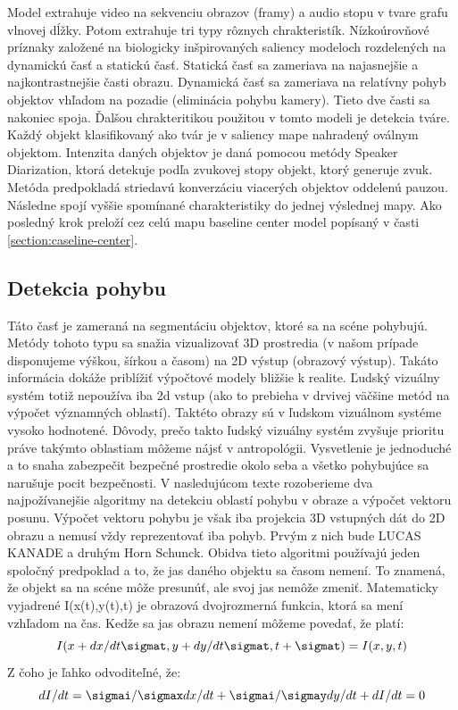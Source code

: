 Model extrahuje video na sekvenciu obrazov (framy) a audio stopu v tvare grafu vlnovej dĺžky.
Potom extrahuje tri typy rôznych chrakteristík.
Nízkoúrovňové príznaky založené na biologicky inšpirovaných saliency modeloch rozdelených na dynamickú časť a statickú časť.
Statická časť sa zameriava na najasnejšie a najkontrastnejšie časti obrazu.
Dynamická časť sa zameriava na relatívny pohyb objektov vhľadom na pozadie (eliminácia pohybu kamery).
Tieto dve časti sa nakoniec spoja.
Ďalšou chrakteritikou použitou v tomto modeli je detekcia tváre.
Každý objekt klasifikovaný ako tvár je v saliency mape nahradený oválnym objektom.
Intenzita daných objektov je daná pomocou metódy Speaker Diarization\cite{sound-courot-2}, ktorá detekuje podľa zvukovej stopy objekt, ktorý generuje zvuk.
Metóda predpokladá striedavú konverzáciu viacerých objektov oddelenú pauzou.
Následne spojí vyššie spomínané charakteristiky do jednej výslednej mapy.
Ako posledný krok preloží cez celú mapu baseline center model popísaný v časti \ref{section:caseline-center}.

\subsection{Detekcia pohybu}
Táto časť je zameraná na segmentáciu objektov, ktoré sa na scéne pohybujú.
Metódy tohoto typu sa snažia vizualizovať 3D prostredia (v našom prípade disponujeme výškou, šírkou a časom) na 2D výstup (obrazový výstup).
Takáto informácia dokáže priblížiť výpočtové modely bližšie k realite.
Ľudský vizuálny systém totiž nepoužíva iba 2d vstup (ako to prebieha v drvivej väčšine metód na výpočet významných oblastí).
Taktéto obrazy sú v ľudskom vizuálnom systéme vysoko hodnotené.
Dôvody, prečo takto ľudský vizuálny systém zvyšuje prioritu práve takýmto oblastiam môžeme nájsť v antropológii.
Vysvetlenie je jednoduché a to snaha zabezpečit bezpečné prostredie okolo seba a všetko pohybujúce sa narušuje pocit bezpečnosti.
V nasledujúcom texte rozoberieme dva najpožívanejšie algoritmy na detekciu oblastí pohybu v obraze a výpočet vektoru posunu.
Výpočet vektoru pohybu je však iba projekcia 3D vstupných dát do 2D obrazu a nemusí vždy reprezentovať iba pohyb.
Prvým z nich bude LUCAS KANADE\cite{lucas-kanade} a druhým Horn Schunck\cite{horn-schunck}.
Obidva tieto algoritmi používajú jeden spoločný predpoklad a to, že jas daného objektu sa časom nemení.
To znamená, že objekt sa na scéne môže presunúť, ale svoj jas nemôže zmeniť.
Matematicky vyjadrené I(x(t),y(t),t) je obrazová dvojrozmerná funkcia, ktorá sa mení vzhľadom na čas.
Kedže sa jas obrazu nemení môžeme povedať, že platí:
\begin{equation}
  I(x + dx/dt \sigmat ,y + dy/dt \sigmat, t + \sigmat) = I(x,y,t)
\end{equation}
Z čoho je ľahko odvoditeľné, že:
\begin{equation}
  dI/dt = \sigmai/\sigmax dx/dt + \sigmai/\sigmay dy/dt + dI/dt  =  0
\end{equation}

